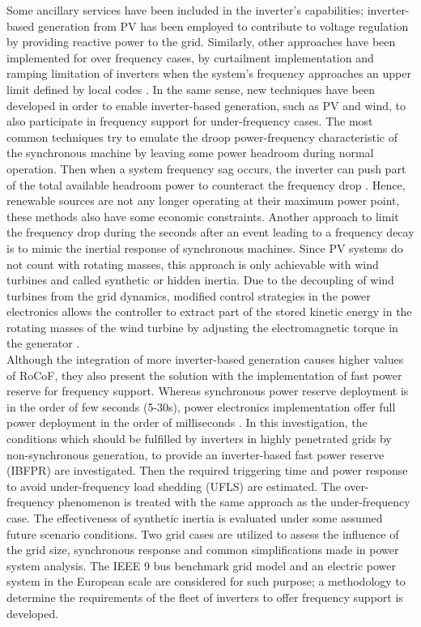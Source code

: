 Some ancillary services have been included in the inverter’s capabilities; inverter-based generation from PV has been employed to contribute to voltage regulation by providing reactive power to the grid. Similarly, other approaches have been implemented for over frequency cases, by curtailment implementation and ramping limitation of inverters when the system's frequency approaches an upper limit defined by local codes \cite{hoke2018fast, hokefreqwatt}. In the same sense, new techniques have been developed in order to enable inverter-based generation, such as PV and wind, to also participate in frequency support for under-frequency cases. The most common techniques try to emulate the droop power-frequency characteristic of the synchronous machine by leaving some power headroom during normal operation. Then when a system frequency sag occurs, the inverter can push part of the total available headroom power to counteract the frequency drop \cite{dreidy2017inertia}. Hence, renewable sources are not any longer operating at their maximum power point, these methods also have some economic constraints. Another approach to limit the frequency drop during the seconds after an event leading to a frequency decay is to mimic the inertial response of synchronous machines. Since PV systems do not count with rotating masses, this approach is only achievable with wind turbines and called synthetic or hidden inertia. Due to the decoupling of wind turbines from the grid dynamics, modified control strategies in the power electronics allows the controller to extract part of the stored kinetic energy in the rotating masses of the wind turbine by adjusting the electromagnetic torque in the generator \cite{dreidy2017inertia}. \\

Although the integration of more inverter-based generation causes higher values of RoCoF, they also present the solution with the implementation of fast power reserve for frequency support. Whereas synchronous power reserve deployment is in the order of few seconds (5-30s), power electronics implementation offer full power deployment in the order of milliseconds \cite{miller2017technology}. In this investigation, the conditions which should be fulfilled by inverters in highly penetrated grids by non-synchronous generation, to provide an inverter-based fast power reserve (IBFPR) are investigated. Then the required triggering time and power response to avoid under-frequency load shedding (UFLS) are estimated. The over-frequency phenomenon is treated with the same approach as the under-frequency case. The effectiveness of synthetic inertia is evaluated under some assumed future scenario conditions. Two grid cases are utilized to assess the influence of the grid size, synchronous response and common simplifications made in power system analysis. The IEEE 9 bus benchmark grid model and an electric power system in the European scale are considered for such purpose; a methodology to determine the requirements of the fleet of inverters to offer frequency support is developed.
